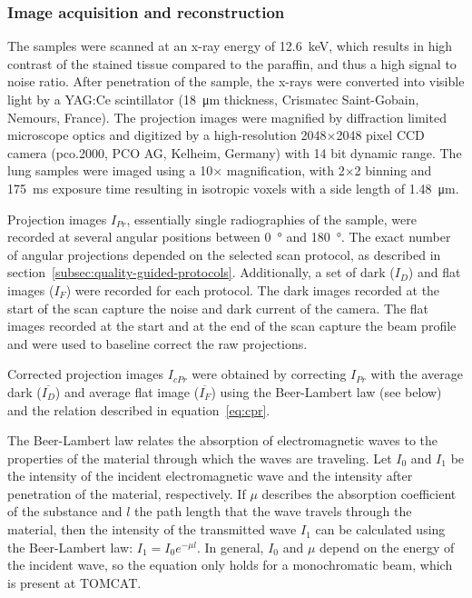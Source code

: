 \subsubsection{Image acquisition and reconstruction}%
\label{seq:Image Acquisition}%
The samples were scanned at an x-ray energy of \SI{12.6}{\kilo\electronvolt}, which results in high contrast of the stained tissue compared to the paraffin, and thus a high signal to noise ratio. After penetration of the sample, the x-rays were converted into visible light by a YAG:Ce scintillator (\SI{18}{\micro\meter} thickness, Crismatec Saint-Gobain, Nemours, France). The projection images were magnified by diffraction limited microscope optics and digitized by a high-resolution 2048$\times$2048 pixel CCD camera (pco.2000, PCO AG, Kelheim, Germany) with 14 bit dynamic range. The lung samples were imaged using a 10$\times$ magnification, with 2$\times$2 binning and \SI{175}{\milli\second} exposure time resulting in isotropic voxels with a side length of \SI{1.48}{\micro\meter}.

Projection images $I_{Pr}$, essentially single radiographies of the sample, were recorded at several angular positions between \SI{0}{\degree} and \SI{180}{\degree}. The exact number of angular projections depended on the selected scan protocol, as described in section~\ref{subsec:quality-guided-protocols}. Additionally, a set of dark ($I_{D}$) and flat images ($I_{F}$) were recorded for each protocol. The dark images recorded at the start of the scan capture the noise and dark current of the camera. The flat images recorded at the start and at the end of the scan capture the beam profile and were used to baseline correct the raw projections.

Corrected projection images $I_{cPr}$ were obtained by correcting $I_{Pr}$ with the average dark ($\overline{I_{D}}$) and average flat image ($\overline{I_{F}}$) using the Beer-Lambert law (see below) and the relation described in equation~\ref{eq:cpr}.

The Beer-Lambert law relates the absorption of electromagnetic waves to the properties of the material through which the waves are traveling. Let $I_{0}$ and $I_{1}$ be the intensity of the incident electromagnetic wave and the intensity after penetration of the material, respectively. If $\mu$ describes the absorption coefficient of the substance and $l$ the path length that the wave travels through the material, then the intensity of the transmitted wave $I_{1}$ can be calculated using the Beer-Lambert law: \(I_{1}=I_{0}e^{-\mu l}\label{eq:beer-lambert}\). In general, $I_{0}$ and $\mu$ depend on the energy of the incident wave, so the equation only holds for a monochromatic beam, which is present at TOMCAT.

